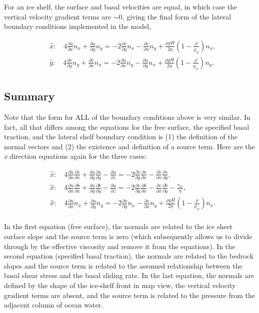 For an ice shelf, the surface and basal velocities are equal, in which case the vertical velocity gradient terms are $\sim{0}$, giving the final form of the lateral boundary conditions implemented in the model,

\begin{align*}
  & \hat{x}:\quad 4\frac{\partial u}{\partial x}n_{x}+\frac{\partial u}{\partial y}n_{y}=-2\frac{\partial v}{\partial y}n_{x}-\frac{\partial v}{\partial x}n_{y}+\frac{\rho gH}{2\eta }\left( 1-\frac{\rho }{\rho _{w}} \right)n_{x}, \\ 
 & \hat{y}:\quad 4\frac{\partial v}{\partial y}n_{y}+\frac{\partial v}{\partial x}n_{x}=-2\frac{\partial u}{\partial x}n_{y}-\frac{\partial u}{\partial y}n_{x}+\frac{\rho gH}{2\eta }\left( 1-\frac{\rho }{\rho _{w}} \right)n_{y}. \\ 
\end{align*}

\subsection{Summary}
Note that the form for ALL of the boundary conditions above is very similar. In fact, all that differs among the equations for the free surface, the specified basal traction, and the lateral shelf boundary condition is (1) the definition of the normal vectors and (2) the existence and definition of a source term. Here are the \textit{x} direction equations again for the three cases:

\begin{align*}
  & \hat{x}:\quad 4\frac{\partial u}{\partial x}\frac{\partial s}{\partial x}+ \frac{\partial u}{\partial y}\frac{\partial s}{\partial y}-\frac{\partial u}{\partial z}=-2 \frac{\partial v}{\partial y}\frac{\partial s}{\partial x}-\frac{\partial v}{\partial x}\frac{\partial s}{\partial y}, \\ 
  & \hat{x}:\quad 4\frac{\partial u}{\partial x}\frac{\partial b}{\partial x}+\frac{\partial u}{\partial y}\frac{\partial b}{\partial y}-\frac{\partial u}{\partial z}=-2\frac{\partial v}{\partial y}\frac{\partial b}{\partial x}-\frac{\partial v}{\partial x}\frac{\partial b}{\partial y}-\frac{\tau _{bx}}{\eta }, \\ 
  & \hat{x}:\quad 4\frac{\partial u}{\partial x}n_{x}+\frac{\partial u}{\partial y}n_{y}=-2\frac{\partial v}{\partial y}n_{x}-\frac{\partial v}{\partial x}n_{y}+\frac{\rho gH}{2\eta }\left( 1-\frac{\rho }{\rho _{w}} \right)n_{x}. \\
\end{align*}

In the first equation (free surface), the normals are related to the ice sheet surface slope and the source term is zero (which subsequently allows us to divide through by the effective viscosity and remove it from the equations). In the second equation (specified basal traction), the normals are related to the bedrock slopes and the source term is related to the assumed relationship between the basal shear stress and the basal sliding rate. In the last equation, the normals are defined by the shape of the ice-shelf front in map view, the vertical velocity gradient terms are absent, and the source term is related to the pressure from the adjacent column of ocean water.

%